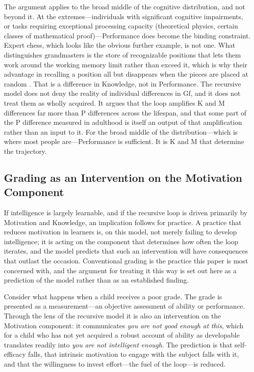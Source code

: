 \documentclass[12pt,a4paper]{article}
\begin{document}
The argument applies to the broad middle of the cognitive distribution, and not beyond it. At the extremes---\hspace{0pt}individuals with significant cognitive impairments, or tasks requiring exceptional processing capacity (theoretical physics, certain classes of mathematical proof)---\hspace{0pt}Performance does become the binding constraint. Expert chess, which looks like the obvious further example, is not one. What distinguishes grandmasters is the store of recognizable positions that lets them work around the working memory limit rather than exceed it, which is why their advantage in recalling a position all but disappears when the pieces are placed at random \citep{ChaseSimon1973}. That is a difference in Knowledge, not in Performance. The recursive model does not deny the reality of individual differences in Gf, and it does not treat them as wholly acquired. It argues that the loop amplifies K and M differences far more than P differences across the lifespan, and that some part of the P difference measured in adulthood is itself an output of that amplification rather than an input to it. For the broad middle of the distribution---\hspace{0pt}which is where most people are---\hspace{0pt}Performance is sufficient. It is K and M that determine the trajectory.

\subsection{Grading as an Intervention on the Motivation Component}

If intelligence is largely learnable, and if the recursive loop is driven primarily by Motivation and Knowledge, an implication follows for practice. A practice that reduces motivation in learners is, on this model, not merely failing to develop intelligence; it is acting on the component that determines how often the loop iterates, and the model predicts that such an intervention will have consequences that outlast the occasion. Conventional grading is the practice this paper is most concerned with, and the argument for treating it this way is set out here as a prediction of the model rather than as an established finding.

Consider what happens when a child receives a poor grade. The grade is presented as a measurement---\hspace{0pt}an objective assessment of ability or performance. Through the lens of the recursive model it is also an intervention on the Motivation component: it communicates \emph{you are not good enough at this}, which for a child who has not yet acquired a robust account of ability as developable translates readily into \emph{you are not intelligent enough}. The prediction is that self-efficacy falls, that intrinsic motivation to engage with the subject falls with it, and that the willingness to invest effort---\hspace{0pt}the fuel of the loop---\hspace{0pt}is reduced.
\end{document}

